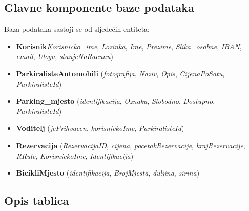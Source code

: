 		
		
		\subsection{Glavne komponente baze podataka}
		Baza podataka sastoji se od sljedećih entiteta:
		
		\begin{itemize}
			\item \textbf{Korisnik}\textit{Korisnicko\_ime}, \textit{Lozinka}, \textit{Ime}, \textit{Prezime}, \textit{Slika\_osobne}, \textit{IBAN}, \textit{email}, \textit{Uloga}, \textit{stanjeNaRacunu})
			
			
			\item \textbf{ParkiralisteAutomobili} (\textit{fotografija}, \textit{Naziv}, \textit{Opis}, \textit{CijenaPoSatu}, \textit{ParkiralisteId}) 
			
			\item \textbf{Parking\_mjesto} (\textit{identifikacija}, \textit{Oznaka}, \textit{Slobodno}, \textit{Dostupno}, \textit{ParkiralisteId})
			
			\item \textbf{Voditelj} (\textit{jePrihvacen}, \textit{korisnickoIme}, \textit{ParkiralisteId})
			
			\item \textbf{Rezervacija} (\textit{RezervacijaID}, \textit{cijena}, \textit{pocetakRezervacije}, \textit{krajRezervacije}, \textit{RRule}, \textit{KorisnickoIme}, \textit{Identifikacija})
			
			\item \textbf{BicikliMjesto} (\textit{identifikacija}, \textit{BrojMjesta}, \textit{duljina}, \textit{sirina})
		\end{itemize}
		
		
		
			\subsection{Opis tablica}
			

				
			
